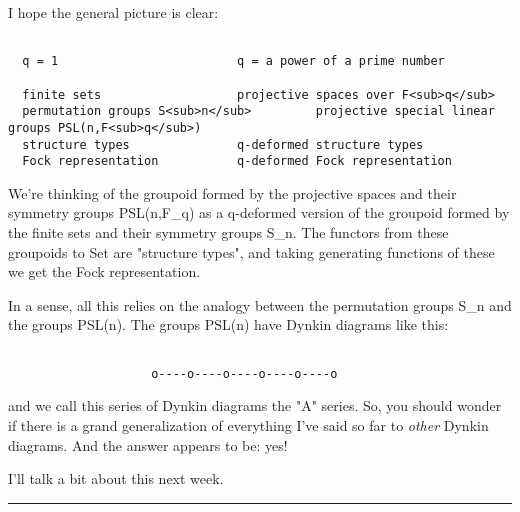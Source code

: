I hope the general picture is clear:

\begin{verbatim}

  q = 1                         q = a power of a prime number    

  finite sets                   projective spaces over F<sub>q</sub>
  permutation groups S<sub>n</sub>         projective special linear groups PSL(n,F<sub>q</sub>)
  structure types               q-deformed structure types
  Fock representation           q-deformed Fock representation

\end{verbatim}
    
We're thinking of the groupoid formed by the projective spaces and their
symmetry groups PSL(n,F_{q}) as a q-deformed version of the groupoid
formed by the finite sets and their symmetry groups S_{n}.   The functors
from these groupoids to Set are "structure types", and taking generating
functions of these we get the Fock representation.

In a sense, all this relies on the analogy between the permutation
groups S_{n} and the groups PSL(n).   The groups PSL(n) have Dynkin
diagrams like this: 

               
\begin{verbatim}

                    o----o----o----o----o----o

\end{verbatim}
    
and we call this series of Dynkin diagrams the "A" series.  So, you
should wonder if there is a grand generalization of everything I've
said so far to \emph{other} Dynkin diagrams.  And the answer appears to be:
yes!  

I'll talk a bit about this next week.

\par\noindent\rule{\textwidth}{0.4pt}


